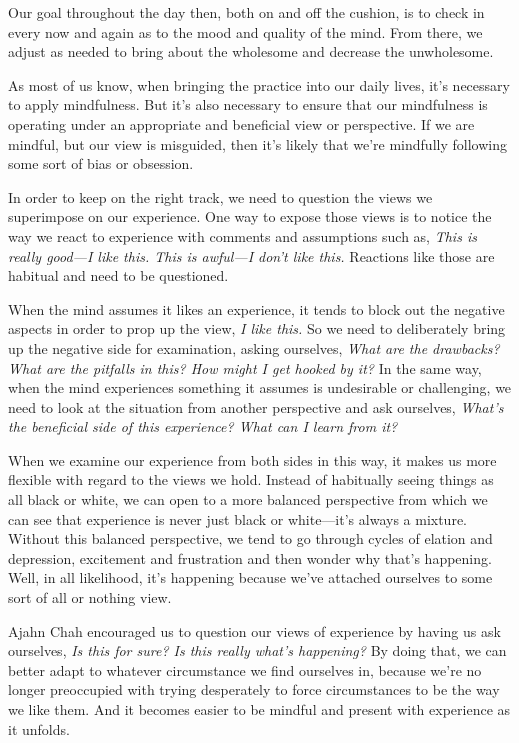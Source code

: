 Our goal throughout the day then, both on and off the cushion, is to 
check in every now and again as to the mood and quality of the mind. 
From there, we adjust as needed to bring about the wholesome and 
decrease the unwholesome.


As most of us know, when bringing the practice into our daily lives, 
it's necessary to apply mindfulness. But it's also necessary to ensure 
that our mindfulness is operating under an appropriate and beneficial 
view or perspective. If we are mindful, but our view is misguided, then 
it's likely that we're mindfully following some sort of bias or 
obsession.

In order to keep on the right track, we need to question the views we 
superimpose on our experience. One way to expose those views is to 
notice the way we react to experience with comments and assumptions 
such as, \emph{This is really good---I like this. This is awful---I 
don't like this.} Reactions like those are habitual and need to be 
questioned.

When the mind assumes it likes an experience, it tends to block out the 
negative aspects in order to prop up the view, \emph{I like this.} So 
we need to deliberately bring up the negative side for examination, 
asking ourselves, \emph{What are the drawbacks? What are the pitfalls 
in this? How might I get hooked by it?} In the same way, when the mind 
experiences something it assumes is undesirable or challenging, we need 
to look at the situation from another perspective and ask ourselves, 
\emph{What's the beneficial side of this experience? What can I learn 
from it?}

When we examine our experience from both sides in this way, it makes us 
more flexible with regard to the views we hold. Instead of habitually 
seeing things as all black or white, we can open to a more balanced 
perspective from which we can see that experience is never just black 
or white---it's always a mixture. Without this balanced perspective, we 
tend to go through cycles of elation and depression, excitement and 
frustration and then wonder why that's happening. Well, in all 
likelihood, it's happening because we've attached ourselves to some 
sort of all or nothing view.

Ajahn Chah encouraged us to question our views of experience by having 
us ask ourselves, \emph{Is this for sure? Is this really what's 
happening?} By doing that, we can better adapt to whatever circumstance 
we find ourselves in, because we're no longer preoccupied with trying 
desperately to force circumstances to be the way we like them. And it 
becomes easier to be mindful and present with experience as it unfolds.

